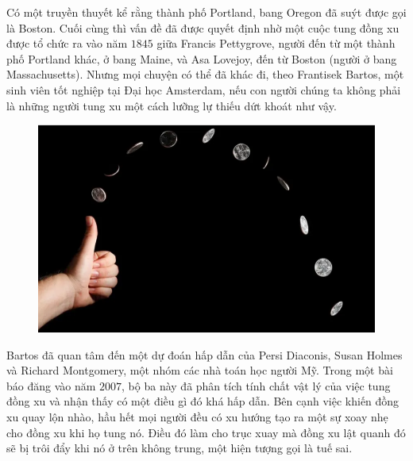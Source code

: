 \vspace*{185pt}

%
%

\begin{multicols}{2}
	Có một truyền thuyết  kể rằng thành phố Portland, bang Oregon đã suýt được gọi là Boston. Cuối cùng thì vấn đề đã được quyết định nhờ một cuộc tung đồng xu được tổ chức ra vào năm $1845$ giữa Francis Pettygrove, người đến từ một thành phố Portland khác, ở bang Maine, và Asa Lovejoy, đến từ Boston (người ở bang Massachusetts). Nhưng mọi chuyện có thể đã khác đi, theo Frantisek Bartos, một sinh viên tốt nghiệp tại Đại học Amsterdam, nếu con người chúng ta  không phải là những người tung xu một cách lưỡng lự thiếu dứt khoát như vậy.
	\begin{figure}[H]
		\vspace*{-5pt}
		\centering
		\captionsetup{labelformat= empty, justification=centering}
		\includegraphics[width= 1\linewidth]{1111}
		\vspace*{-15pt}
	\end{figure}
	Bartos đã quan tâm đến một dự đoán hấp dẫn của Persi Diaconis, Susan Holmes và Richard Montgomery, một nhóm các nhà toán học người Mỹ. Trong một bài báo đăng vào năm $2007$, bộ ba này đã phân tích tính chất vật lý của việc tung đồng xu và nhận thấy có một điều gì đó khá hấp dẫn. Bên cạnh việc khiến đồng xu quay lộn nhào, hầu hết mọi người đều có xu hướng tạo ra một sự xoay nhẹ cho đồng xu khi họ tung nó. Điều đó làm cho trục xuay mà đồng xu lật quanh đó sẽ bị trôi đẩy khi nó ở trên không trung, một hiện tượng gọi là tuế sai.

\end{multicols}
